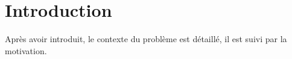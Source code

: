 \chapter*{Introduction}
Après avoir introduit, le contexte du problème est détaillé, il est suivi par la motivation.
